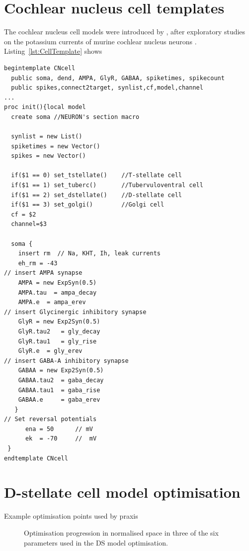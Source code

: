 \section{Cochlear nucleus cell templates}

The cochlear nucleus cell models were introduced by \citet{RothmanManis:2003b},
after exploratory studies on the potassium currents of murine cochlear nucleus
neurons
\citep{RothmanManis:2003,RothmanManis:2003a}. Listing~\ref{lst:CellTemplate}
shows

\begin{lstlisting}[label=lst:CellTemplate,caption=Rothman and Manis cochlear
  nucleus cell template (in CNcell.tem)]
begintemplate CNcell
  public soma, dend, AMPA, GlyR, GABAA, spiketimes, spikecount
  public spikes,connect2target, synlist,cf,model,channel
...
proc init(){local model
  create soma //NEURON's section macro 

  synlist = new List()
  spiketimes = new Vector()
  spikes = new Vector()
    
  if($1 == 0) set_tstellate()    //T-stellate cell
  if($1 == 1) set_tuberc()       //Tubervuloventral cell
  if($1 == 2) set_dstellate()    //D-stellate cell
  if($1 == 3) set_golgi()        //Golgi cell
  cf = $2
  channel=$3

  soma {
    insert rm  // Na, KHT, Ih, leak currents 
    eh_rm = -43 
// insert AMPA synapse 
    AMPA = new ExpSyn(0.5)
    AMPA.tau  = ampa_decay
    AMPA.e 	= ampa_erev
// insert Glycinergic inhibitory synapse 
    GlyR = new Exp2Syn(0.5)
    GlyR.tau2	= gly_decay
    GlyR.tau1	= gly_rise
    GlyR.e 	= gly_erev
// insert GABA-A inhibitory synapse 
    GABAA = new Exp2Syn(0.5)
    GABAA.tau2 	= gaba_decay
    GABAA.tau1 	= gaba_rise
    GABAA.e 	= gaba_erev
   }
// Set reversal potentials 
      ena = 50		// mV
      ek  = -70		//  mV
 }
endtemplate CNcell 

\end{lstlisting}

\section{D-stellate cell model optimisation}

Example optimisation points used by praxis 
\begin{figure}[htb]
\centering
{}
 \caption{Optimisation progression in normalised space in three of the six parameters used in the DS model optimisation.} \label{fig:DShandtuned}
 \end{figure}


